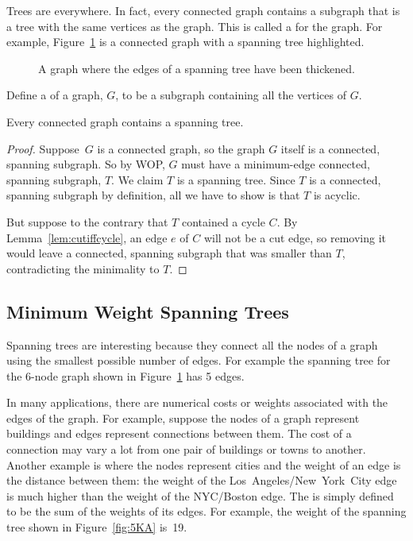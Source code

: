 Trees are everywhere.  In fact, every connected graph contains a
subgraph that is a tree with the same vertices as the graph.  This is
called a  for the graph.  For example,
Figure~\ref{fig:5LL} is a connected graph with a spanning tree
highlighted.

\begin{figure}


\caption{A graph where the edges of a spanning tree have been
  thickened.}

\label{fig:5LL}

\end{figure}

\begin{definition}
Define a  of a graph, $G$, to be a subgraph
containing all the vertices of $G$.
\end{definition}

\begin{theorem}
Every connected graph contains a spanning tree.
\end{theorem}

\begin{proof}
Suppose~$G$ is a connected graph, so the graph $G$ itself is a
connected, spanning subgraph.  So by WOP, $G$ must have a minimum-edge
connected, spanning subgraph, $T$.  We claim $T$ is a spanning tree.
Since $T$ is a connected, spanning subgraph by definition, all we have
to show is that $T$ is acyclic.

But suppose to the contrary that $T$ contained a cycle $C$.  By
Lemma~\ref{lem:cutiffcycle}, an edge $e$ of $C$ will not be a cut
edge, so removing it would leave a connected, spanning subgraph that
was smaller than $T$, contradicting the minimality to $T$.
\end{proof}

\subsection{Minimum Weight Spanning Trees}\label{MST_subsec}

Spanning trees are interesting because they connect all the nodes of a
graph using the smallest possible number of edges.  For example the
spanning tree for the 6-node graph shown in Figure~\ref{fig:5LL} has 5
edges.

In many applications, there are numerical costs or weights associated
with the edges of the graph.  For example, suppose the nodes of a
graph represent buildings and edges represent connections between
them.  The cost of a connection may vary a lot from one pair of
buildings or towns to another.  Another example is where the nodes
represent cities and the weight of an edge is the distance between
them: the weight of the Los~Angeles/New~York~City edge is much higher
than the weight of the NYC/Boston edge.  The  is
simply defined to be the sum of the weights of its edges.  For
example, the weight of the spanning tree shown in Figure~\ref{fig:5KA}
is~19.

